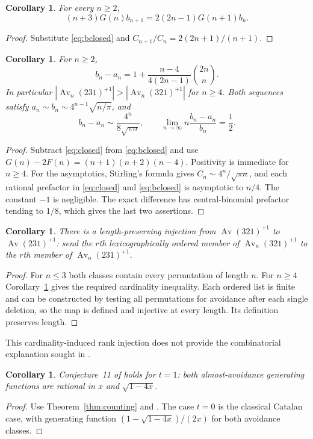 \documentclass[10pt]{article}
\newtheorem{corollary}[theorem]{Corollary}
\begin{document}
\begin{corollary}\label{cor:bfirst}
For every $n\geq2$,
\[
 (n+3)G(n)b_{n+1}=2(2n-1)G(n+1)b_n.
\]
\end{corollary}
\begin{proof}
Substitute \eqref{eq:bclosed} and $C_{n+1}/C_n=2(2n+1)/(n+1)$.
\end{proof}

\begin{corollary}\label{cor:difference}
For $n\geq2$,
\[
 b_n-a_n=1+\frac{n-4}{4(2n-1)}\binom{2n}{n}.
\]
In particular
$|\operatorname{Av}_n(231)^{+1}|>|\operatorname{Av}_n(321)^{+1}|$
for $n\geq4$. Both sequences satisfy
$a_n\sim b_n\sim 4^{n-1}\sqrt{n/\pi}$, and
\[
 b_n-a_n\sim\frac{4^n}{8\sqrt{\pi n}},\qquad
 \lim_{n\to\infty}n\frac{b_n-a_n}{b_n}=\frac12.
\]
\end{corollary}
\begin{proof}
Subtract \eqref{eq:closed} from \eqref{eq:bclosed} and use
$G(n)-2F(n)=(n+1)(n+2)(n-4)$. Positivity is immediate for $n\geq4$.
For the asymptotics, Stirling's formula gives $C_n\sim4^n/\sqrt{\pi n}$,
and each rational prefactor in \eqref{eq:closed} and \eqref{eq:bclosed}
is asymptotic to $n/4$. The constant $-1$ is negligible.
The exact difference has central-binomial prefactor tending to $1/8$,
which gives the last two assertions.
\end{proof}

\begin{corollary}\label{cor:injection}
There is a length-preserving injection from
$\operatorname{Av}(321)^{+1}$ to $\operatorname{Av}(231)^{+1}$:
send the $r$th lexicographically ordered member of
$\operatorname{Av}_n(321)^{+1}$ to the $r$th member of
$\operatorname{Av}_n(231)^{+1}$.
\end{corollary}
\begin{proof}
For $n\leq3$ both classes contain every permutation of length $n$.
For $n\geq4$ Corollary~\ref{cor:difference} gives the required cardinality
inequality. Each ordered list is finite and can be constructed by testing
all permutations for avoidance after each single deletion, so the map
is defined and injective at every length. Its definition preserves length.
\end{proof}
This cardinality-induced rank injection does not provide the combinatorial
explanation sought in \cite[Problem~10]{almost}.

\begin{corollary}\label{cor:conjecture11}
Conjecture~11 of \cite{almost} holds for $t=1$: both almost-avoidance
generating functions are rational in $x$ and $\sqrt{1-4x}$.
\end{corollary}
\begin{proof}
Use Theorem~\ref{thm:counting} and \cite[Theorem~9]{almost}.
The case $t=0$ is the classical Catalan case, with generating function
$(1-\sqrt{1-4x})/(2x)$ for both avoidance classes.
\end{proof}
\end{document}
